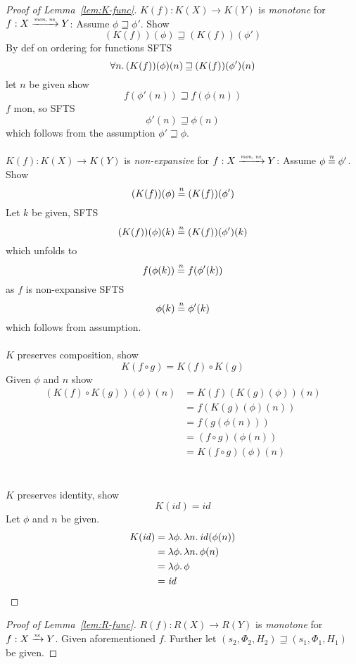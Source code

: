 \documentclass{article}
\newcommand{\monnefun}{\xrightarrow{\textit{\tiny{mon, ne}}}}
\newcommand{\nefun}{\xrightarrow{\textit{\tiny{ne}}}}
\newcommand{\nequal}[1][n]{\stackrel{\tiny{#1}}{=}}
\newcommand{\id}{\var{id}}
\newcommand{\var}[1]{\mathit{#1}}
\newcommand{\future}{\mathbin{\sqsupseteq}}
\begin{document}
\begin{appendices}
\begin{proof}[Proof of Lemma~\ref{lem:K-func}]
  $K(f) : K(X) \rightarrow K(Y)$ is \emph{monotone} for $f : X \monnefun Y$:
  Assume $\phi \future \phi'$. Show
  \[
    (K(f))(\phi) \future (K(f))(\phi') 
  \]
  By def on ordering for functions SFTS
  \[
    \forall n \ldotp (K(f))(\phi)(n) \future (K(f))(\phi')(n)
  \]
  let $n$ be given show
  \[
    f(\phi'(n)) \future f(\phi(n))
  \]
  $f$ mon, so SFTS
  \[
    \phi'(n) \future \phi(n)
  \]
  which follows from the assumption $\phi' \future \phi$.\\\\
  $K(f) : K(X) \rightarrow K(Y)$ is \emph{non-expansive} for $f : X \monnefun Y$:
  Assume $\phi \nequal \phi'$. Show
  \[
    (K(f))(\phi) \nequal (K(f))(\phi') 
  \]
  Let $k$ be given, SFTS
  \[
    (K(f))(\phi)(k) \nequal (K(f))(\phi')(k)
  \]
  which unfolds to
  \[
    f(\phi(k)) \nequal f(\phi'(k))
  \]
  as $f$ is non-expansive SFTS
  \[
    \phi(k) \nequal \phi'(k)
  \]
  which follows from assumption.\\\\
  $K$ preserves composition, show
  \[
    K(f \circ g) = K(f) \circ K(g)
  \]
  Given $\phi$ and $n$ show
  \begin{align*}
    (K(f) \circ K(g))(\phi)(n) & = K(f)(K(g)(\phi))(n) \\
                               & = f(K(g)(\phi)(n)) \\
                               & = f(g(\phi(n))) \\
                               & = (f \circ g)(\phi(n)) \\
                               & = K(f \circ g)(\phi)(n)
  \end{align*}\\\\
  $K$ preserves identity, show
  \[
    K(\id) = \id
  \]
  Let $\phi$ and $n$ be given.
  \begin{align*}
    K(\id) & = \lambda \phi \ldotp \lambda n \ldotp \id(\phi(n)) \\
           & = \lambda \phi \ldotp \lambda n \ldotp \phi(n) \\
           & = \lambda \phi \ldotp \phi \\
           & = \id
  \end{align*}
\end{proof}

\begin{proof}[Proof of Lemma~\ref{lem:R-func}]
   $R(f) : R(X) \rightarrow R(Y)$ is \emph{monotone} for $f : X \nefun Y$. Given aforementioned $f$. Further let $(s_2,\Phi_2,H_2) \future (s_1,\Phi_1,H_1)$ be given. 


\end{proof}
\end{appendices}
\end{document}
